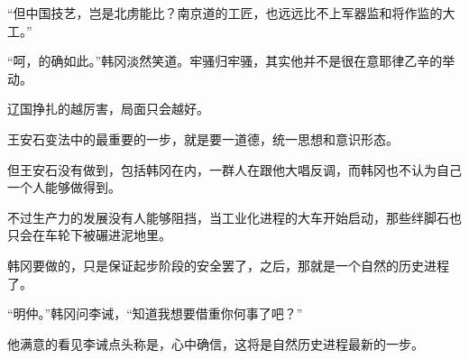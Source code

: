 “但中国技艺，岂是北虏能比？南京道的工匠，也远远比不上军器监和将作监的大工。”

“呵，的确如此。”韩冈淡然笑道。牢骚归牢骚，其实他并不是很在意耶律乙辛的举动。

辽国挣扎的越厉害，局面只会越好。

王安石变法中的最重要的一步，就是要一道德，统一思想和意识形态。

但王安石没有做到，包括韩冈在内，一群人在跟他大唱反调，而韩冈也不认为自己一个人能够做得到。

不过生产力的发展没有人能够阻挡，当工业化进程的大车开始启动，那些绊脚石也只会在车轮下被碾进泥地里。

韩冈要做的，只是保证起步阶段的安全罢了，之后，那就是一个自然的历史进程了。

“明仲。”韩冈问李诫，“知道我想要借重你何事了吧？”

他满意的看见李诫点头称是，心中确信，这将是自然历史进程最新的一步。
